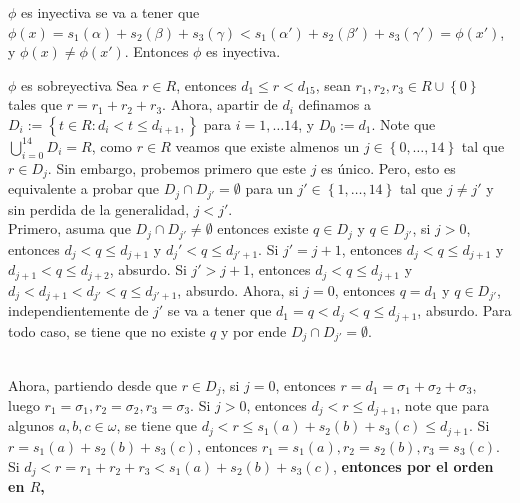 \documentclass{article}
\begin{document}
\begin{itemize}
\begin{mathcase}{\(\phi\) es inyectiva}
            se va a tener que \(\phi(x) = s_1(\alpha) + s_2(\beta) + s_3(\gamma) < s_1(\alpha') + s_2(\beta') + s_3(\gamma') = \phi(x')\), y \(\phi(x) \neq \phi(x')\).
            Entonces \(\phi\) es inyectiva.
        \end{mathcase}
        \begin{mathcase}{\(\phi\) es sobreyectiva}
            \vspace{-3ex}
            Sea \(r \in R\), entonces \(d_1 \leq r < d_{15}\),
            sean \(r_1, r_2, r_3 \in R \cup \left\{0\right\}\) tales que \(r = r_1 + r_2 + r_3\). 
            Ahora, apartir de \(d_i\) definamos a \(D_i := \left\{t \in R: d_{i} < t \leq d_{i+1}, \right\}\) para \(i = 1, \ldots 14\), y \(D_0 := {d_1}\).
            Note que \(\bigcup_{i=0}^{14}D_i = R\), como \(r \in R\) veamos que existe almenos un \(j \in \left\{0, \dots, 14\right\}\) tal que \(r \in D_j\). 
            Sin embargo, probemos primero que este \(j\) es único. Pero, esto es equivalente a probar que \(D_{j} \cap D_{j'} = \emptyset\)
            para un \(j' \in \left\{1, \ldots, 14\right\}\) tal que \(j \neq j'\) y sin perdida de la generalidad, \(j < j'\).
            \\
            Primero, asuma que \(D_j \cap D_{j'} \neq \emptyset\) entonces existe \(q \in D_j\) y \(q \in D_{j'}\), si \(j > 0\), entonces 
            \(d_j < q \leq d_{j+1}\) y \(d_j' < q \leq d_{j'+1}\). Si \(j' = j + 1\), entonces \(d_j < q \leq d_{j+1}\) y \(d_{j+1} < q \leq d_{j+2}\), absurdo.
            Si \(j' > j + 1\), entonces \(d_j < q \leq d_{j+1}\) y \(d_{j} < d_{j+1} < d_{j'} < q \leq d_{j'+1}\), absurdo. 
            Ahora, si \(j = 0\), entonces \(q = d_1\) y \(q \in D_{j'}\), independientemente de \(j'\) se va a tener que \(d_1 = q < d_j < q \leq d_{j+1}\), absurdo.
            Para todo caso, se tiene que no existe \(q\) y por ende \(D_j \cap D_{j'} = \emptyset\). 
        \end{mathcase}
            \\
            Ahora, partiendo desde que \(r \in D_j\), si \(j = 0\), entonces \(r = d_1 = \sigma_1 + \sigma_2 + \sigma_3\), luego 
            \(r_1 = \sigma_1, r_2 = \sigma_2, r_3 = \sigma_3\). Si \(j > 0\), entonces \(d_j < r \leq d_{j+1}\), note que para algunos \(a, b, c \in \omega\), 
            se tiene que \(d_j < r \leq s_1(a) + s_2(b) + s_3(c) \leq d_{j+1}\). Si \(r = s_1(a) + s_2(b) + s_3(c)\), entonces \(r_1 = s_1(a), r_2 = s_2(b), r_3 = s_3(c)\).
            Si \(d_{j} < r = r_1 + r_2 + r_3 < s_1(a) + s_2(b) + s_3(c)\), \textbf{entonces por el orden en \(R\), 
}
\end{itemize}
\end{document}
